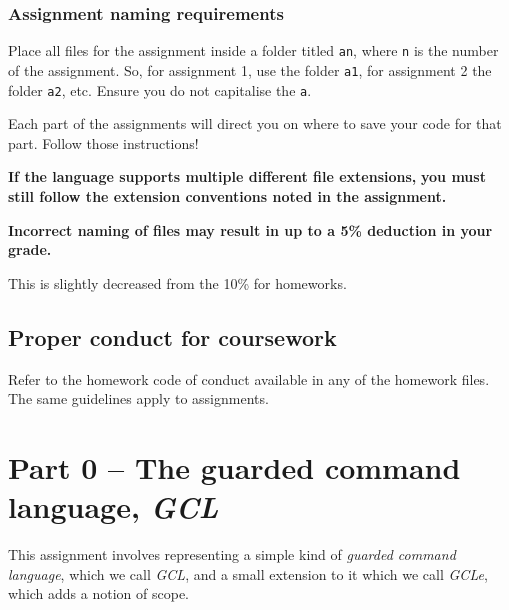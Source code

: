 \documentclass[11pt]{article}
\theoremstyle{definition}
\begin{document}
\subsubsection*{Assignment naming requirements}
\label{sec:orge4940aa}

Place all files for the assignment
inside a folder titled \texttt{an}, where \texttt{n} is the number of the assignment.
So, for assignment 1, use the folder \texttt{a1}, for assignment 2 the folder \texttt{a2}, etc.
Ensure you do not capitalise the \texttt{a}.

Each part of the assignments will direct you on where to
save your code for that part. Follow those instructions!

\begin{center}
\textbf{If the language supports multiple different file extensions,}
\textbf{you must still follow the extension conventions noted in the assignment.}
\end{center}

\begin{center}
\textbf{Incorrect naming of files may result in up to a 5\% deduction in your grade.}
\end{center}
This is slightly decreased from the 10\% for homeworks.

\subsection*{Proper conduct for coursework}
\label{sec:org2b6c94f}
Refer to the homework code of conduct available in any of the homework files.
The same guidelines apply to assignments.

\section*{Part 0 – The guarded command language, \emph{GCL}}
\label{sec:org7a676d6}
This assignment involves representing a simple
kind of \emph{guarded command language}, which we call \emph{GCL},
and a small extension to it which we call \emph{GCLe},
which adds a notion of scope.
\end{document}
